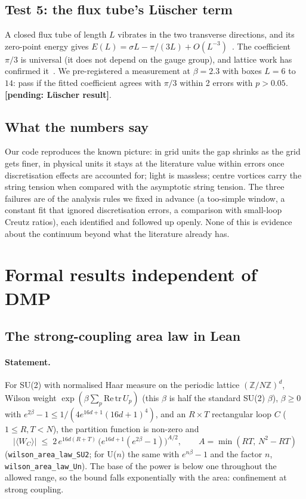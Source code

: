 \documentclass[11pt,a4paper]{article}
\newcommand{\lean}[1]{\texttt{#1}}
\newcommand{\pending}[1]{\textbf{[pending: #1]}}
\begin{document}
\subsection{Test 5: the flux tube's L\"uscher term}

A closed flux tube of length $L$ vibrates in the two transverse directions, and its zero-point energy gives
$E(L)=\sigma L-\pi/(3L)+O(L^{-3})$~\cite{luscher81}. The coefficient $\pi/3$ is universal (it does not depend on the gauge group), and
lattice work has confirmed it~\cite{lw02}. We pre-registered a measurement at $\beta=2.3$ with boxes $L=6$ to $14$: pass if the fitted
coefficient agrees with $\pi/3$ within 2 errors with $p>0.05$. \pending{L\"uscher result}.

\subsection{What the numbers say}

Our code reproduces the known picture: in grid units the gap shrinks as the grid gets finer, in physical units it stays at the literature
value within errors once discretisation effects are accounted for; light is massless; centre vortices carry the string tension when compared
with the asymptotic string tension. The three failures are of the analysis rules we fixed in advance (a too-simple window, a constant fit
that ignored discretisation errors, a comparison with small-loop Creutz ratios), each identified and followed up openly. None of this is
evidence about the continuum beyond what the literature already has.

\section{Formal results independent of DMP}\label{sec:formal}

\subsection{The strong-coupling area law in Lean}

\paragraph{Statement.} For SU(2) with normalised Haar measure on the periodic lattice $(\mathbb Z/N\mathbb Z)^d$, Wilson weight
$\exp(\beta\sum_p\mathrm{Re\,tr}\,U_p)$ (this $\beta$ is half the standard SU(2) $\beta$), $\beta\ge0$ with $e^{2\beta}-1\le1/(4e^{16d+1}(16d+1)^4)$, and an $R\times T$ rectangular loop $C$
($1\le R,T<N$), the partition function is non-zero and
\[
|\langle W_C\rangle|\;\le\;2\,e^{16d(R+T)}\,\bigl(e^{16d+1}(e^{2\beta}-1)\bigr)^{A/2},\qquad A=\min(RT,\,N^2-RT)
\]
(\lean{wilson\_area\_law\_SU2}; for U($n$) the same with $e^{n\beta}-1$ and the factor $n$, \lean{wilson\_area\_law\_Un}). The base of the
power is below one throughout the allowed range, so the bound falls exponentially with the area: confinement at strong coupling.
\end{document}
